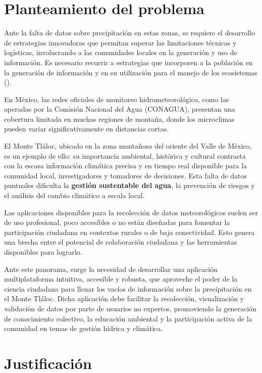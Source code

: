 \section{Planteamiento del problema}

Ante la falta de datos sobre precipitación en estas zonas, se requiere el desarrollo de estrategias innovadoras que permitan superar las limitaciones técnicas y logísticas, involucrando a las comunidades locales en la generación y uso de información. Es necesario recurrir a estrategias que incorporen a la población en la generación de información y en su utilización para el manejo de los ecosistemas (\cite{hubp1990}).


En México, las redes oficiales de monitoreo hidrometeorológico, como las operadas por la Comisión Nacional del Agua (CONAGUA), presentan una cobertura limitada en muchas regiones de montaña, donde los microclimas pueden variar significativamente en distancias cortas. %


El Monte Tláloc, ubicado en la zona montañosa del oriente del Valle de México, es un ejemplo de ello: su importancia ambiental, histórica y cultural contrasta con la escasa información climática precisa y en tiempo real disponible para la comunidad local, investigadores y tomadores de decisiones. Esta falta de datos puntuales dificulta la \textbf{gestión sustentable del agua}, la prevención de riesgos y el análisis del cambio climático a escala local.

Las aplicaciones disponibles para la recolección de datos meteorológicos suelen ser de uso profesional, poco accesibles o no están diseñadas para fomentar la participación ciudadana en contextos rurales o de baja conectividad. Esto genera una brecha entre el potencial de colaboración ciudadana y las herramientas disponibles para lograrlo.

Ante este panorama, surge la necesidad de desarrollar una aplicación multiplataforma intuitiva, accesible y robusta, que aproveche el poder de la ciencia ciudadana para llenar los vacíos de información sobre la precipitación en el Monte Tláloc. Dicha aplicación debe facilitar la recolección, visualización y validación de datos por parte de usuarios no expertos, promoviendo la generación de conocimiento colectivo, la educación ambiental y la participación activa de la comunidad en temas de gestión hídrica y climática.



\section{Justificación}


